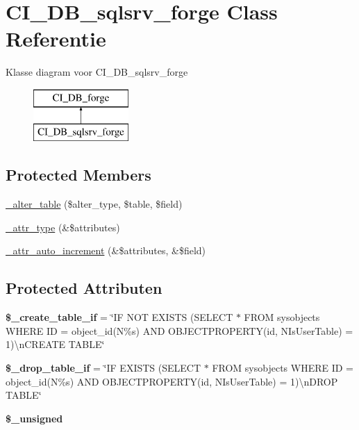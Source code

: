 \hypertarget{class_c_i___d_b__sqlsrv__forge}{}\section{C\+I\+\_\+\+D\+B\+\_\+sqlsrv\+\_\+forge Class Referentie}
\label{class_c_i___d_b__sqlsrv__forge}
Klasse diagram voor C\+I\+\_\+\+D\+B\+\_\+sqlsrv\+\_\+forge\begin{figure}[H]
\begin{center}
\leavevmode
\includegraphics[height=2.000000cm]{class_c_i___d_b__sqlsrv__forge}
\end{center}
\end{figure}
\subsection*{Protected Members}
\begin{DoxyCompactItemize}
\item 
\mbox{\hyperlink{class_c_i___d_b__sqlsrv__forge_a41c6cae02f2fda8b429ad0afb9509426}{\+\_\+alter\+\_\+table}} (\$alter\+\_\+type, \$table, \$field)
\item 
\mbox{\hyperlink{class_c_i___d_b__sqlsrv__forge_a8553be952084c6f7cdfff370a1d14f6b}{\+\_\+attr\+\_\+type}} (\&\$attributes)
\item 
\mbox{\hyperlink{class_c_i___d_b__sqlsrv__forge_a2a013a5932439c3c44f0dad3436525f7}{\+\_\+attr\+\_\+auto\+\_\+increment}} (\&\$attributes, \&\$field)
\end{DoxyCompactItemize}
\subsection*{Protected Attributen}
\begin{DoxyCompactItemize}
\item 
\mbox{\label{class_c_i___d_b__sqlsrv__forge_a2f6484fcb8d1dc3eef67a637227cd583}} 
{\bfseries \$\+\_\+create\+\_\+table\+\_\+if} = \char`\"{}IF N\+OT E\+X\+I\+S\+TS (S\+E\+L\+E\+CT $\ast$ F\+R\+OM sysobjects W\+H\+E\+RE ID = object\+\_\+id(N\textquotesingle{}\%s\textquotesingle{}) A\+ND O\+B\+J\+E\+C\+T\+P\+R\+O\+P\+E\+R\+TY(id, N\textquotesingle{}Is\+User\+Table\textquotesingle{}) = 1)\textbackslash{}n\+C\+R\+E\+A\+TE T\+A\+B\+LE\char`\"{}
\item 
\mbox{\label{class_c_i___d_b__sqlsrv__forge_a92a8a9145a7fc91e252e58d019373581}} 
{\bfseries \$\+\_\+drop\+\_\+table\+\_\+if} = \char`\"{}IF E\+X\+I\+S\+TS (S\+E\+L\+E\+CT $\ast$ F\+R\+OM sysobjects W\+H\+E\+RE ID = object\+\_\+id(N\textquotesingle{}\%s\textquotesingle{}) A\+ND O\+B\+J\+E\+C\+T\+P\+R\+O\+P\+E\+R\+TY(id, N\textquotesingle{}Is\+User\+Table\textquotesingle{}) = 1)\textbackslash{}n\+D\+R\+OP T\+A\+B\+LE\char`\"{}
\item 
{\bfseries \$\+\_\+unsigned}
\end{DoxyCompactItemize}
